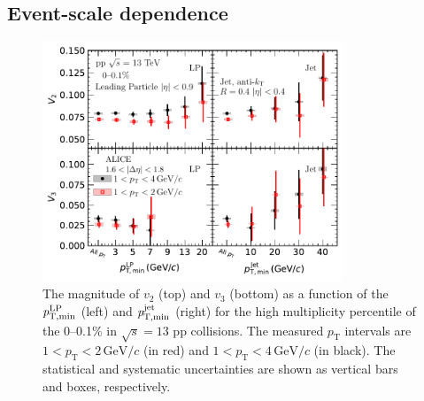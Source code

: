 \subsection{Event-scale dependence}
\begin{figure}[h!]
	\centering
	\hspace{-3em}\includegraphics[width=0.8\textwidth]{figures/Fig4_vn_LP.pdf}
	\caption{The magnitude of $v_2$ (top) and $v_3$ (bottom) as a function of the $\it{p}^{\rm{LP}}_{\rm{T,min}}$ (left) and $\it{p}^{\rm{jet}}_{\rm{T,min}}$ (right) for the high multiplicity percentile of the 0--0.1\% in $\sqrt{s}=13$ pp collisions. The measured $p_{\mathrm{T}}$ intervals are $1<p_{\mathrm{T}}<2\,\mathrm{GeV}/c$ (in red) and $1<p_{\mathrm{T}}<4\,\mathrm{GeV}/c$ (in black). The statistical and systematic uncertainties are shown as vertical bars and boxes, respectively.}
	\label{fig:LPjet23}
\end{figure}    


